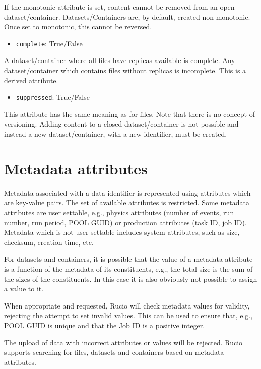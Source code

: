\documentclass{atlasnote}
\newcommand{\code}[1]{\texttt{#1}}
\begin{document}
If the monotonic attribute is set, content cannot be removed from an open dataset/container.
Datasets/Containers are, by default, created non-monotonic. Once set to monotonic, this cannot be reversed.

\begin{itemize}
\item {}
\code{complete}: True/False
\end{itemize}

A dataset/container where all files have replicas available is complete. Any dataset/container which contains files without replicas is incomplete. This is a derived attribute.

\begin{itemize}
\item {}
\code{suppressed}: True/False
\end{itemize}

This attribute has the same meaning as for files.
\newline\newline
Note that there is no concept of versioning. Adding content to a closed dataset/container
is not possible and instead a new dataset/container, with a new identifier, must be created.

\section{Metadata attributes}

Metadata associated with a data identifier is represented using attributes which are key-value pairs. The set of available attributes is restricted. Some metadata attributes are user settable, e.g., physics attributes (number of events, run number, run period, POOL GUID) or production attributes (task ID, job ID). Metadata which is not user settable includes system attributes, such as size, checksum, creation time, etc.

For datasets and containers, it is possible that the value of a metadata attribute is a function of the metadata of its constituents, e.g., the total size is the sum of the sizes of the constituents. In this case it is also obviously not possible to assign a value to it.

When appropriate and requested, Rucio will check metadata values for validity, rejecting the attempt to set invalid values. This can be used to ensure that, e.g., POOL GUID is unique and that the Job ID is a positive integer.

The upload of data with incorrect attributes or values will be rejected. Rucio supports searching for files, datasets and containers based on metadata attributes.
\end{document}
